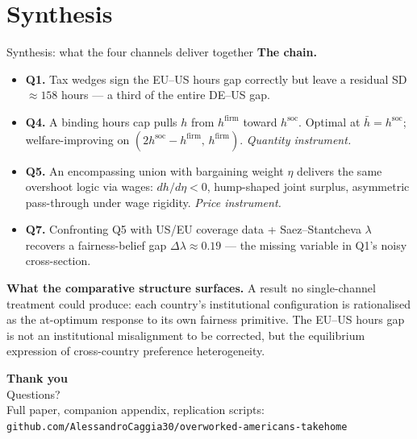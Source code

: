 \documentclass{beamer}
\begin{document}
\section{Synthesis}

\begin{frame}{Synthesis: what the four channels deliver together}
\textbf{The chain.}
\begin{itemize}\setlength{\itemsep}{4pt}
    \item \textbf{Q1.} Tax wedges sign the EU--US hours gap correctly but leave a residual SD $\approx\!158$ hours --- a third of the entire DE--US gap.
    \item \textbf{Q4.} A binding hours cap pulls $h$ from $h^{\mathrm{firm}}$ toward $h^{\mathrm{soc}}$. Optimal at $\bar h\!=\!h^{\mathrm{soc}}$; welfare-improving on $(2h^{\mathrm{soc}}\!-\!h^{\mathrm{firm}},\,h^{\mathrm{firm}})$. \emph{Quantity instrument.}
    \item \textbf{Q5.} An encompassing union with bargaining weight $\eta$ delivers the same overshoot logic via wages: $dh/d\eta\!<\!0$, hump-shaped joint surplus, asymmetric pass-through under wage rigidity. \emph{Price instrument.}
    \item \textbf{Q7.} Confronting Q5 with US/EU coverage data + Saez--Stantcheva $\lambda$ recovers a fairness-belief gap $\Delta\lambda\!\approx\!0.19$ --- the missing variable in Q1's noisy cross-section.
\end{itemize}

\vspace{0.4em}
\textbf{What the comparative structure surfaces.} A result no single-channel treatment could produce: each country's institutional configuration is rationalised as the at-optimum response to its own fairness primitive. The EU--US hours gap is not an institutional misalignment to be corrected, but the equilibrium expression of cross-country preference heterogeneity.
\end{frame}

\begin{frame}
\centering
\vspace{1.5em}
{\Huge \textbf{Thank you}}\\[1.5em]
{\large Questions?}\\[2em]
{\small Full paper, companion appendix, replication scripts:}\\[0.4em]
{\footnotesize \texttt{github.com/AlessandroCaggia30/overworked-americans-takehome}}
\end{frame}
\end{document}
